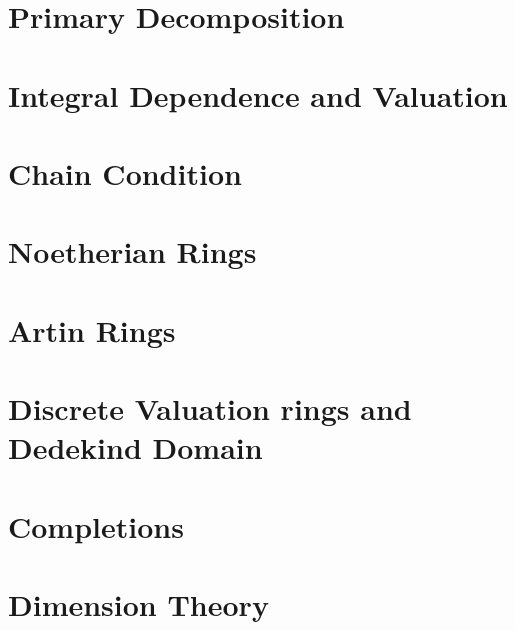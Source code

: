 \documentclass[answers, 12pt]{exam}
\begin{document}
\section{Primary Decomposition}



\section{Integral Dependence and Valuation}



\section{Chain Condition}



\section{Noetherian Rings}



\section{Artin Rings}



\section{Discrete Valuation rings and Dedekind Domain}



\section{Completions}



\section{Dimension Theory}
\end{document}
